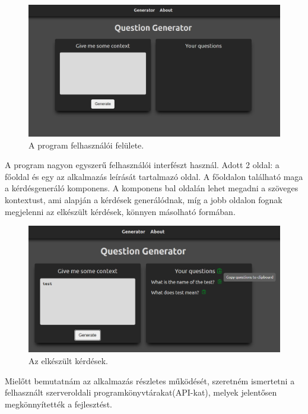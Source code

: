 
\begin{figure}[h]
\centering
\includegraphics[scale=0.5]{images/app_ui.png}
\caption{A program felhasználói felülete.}
\label{fig:app_ui}
\end{figure}

A program nagyon egyszerű felhasználói interfészt használ. Adott 2 oldal: a főoldal és egy az alkalmazás leírását tartalmazó oldal. A főoldalon található maga a kérdésgeneráló komponens. A komponens bal oldalán lehet megadni a szöveges kontextust, ami alapján a kérdések generálódnak, míg a jobb oldalon fognak megjelenni az elkészült kérdések, könnyen másolható formában.

\begin{figure}[h]
\centering
\includegraphics[scale=0.5]{images/app_ui_2.png}
\caption{Az elkészült kérdések.}
\label{fig:app_ui_2}
\end{figure}


Mielőtt bemutatnám az alkalmazás részletes működését, szeretném ismertetni a felhasznált szerveroldali programkönyvtárakat(API-kat), melyek jelentősen megkönnyítették a fejlesztést.

